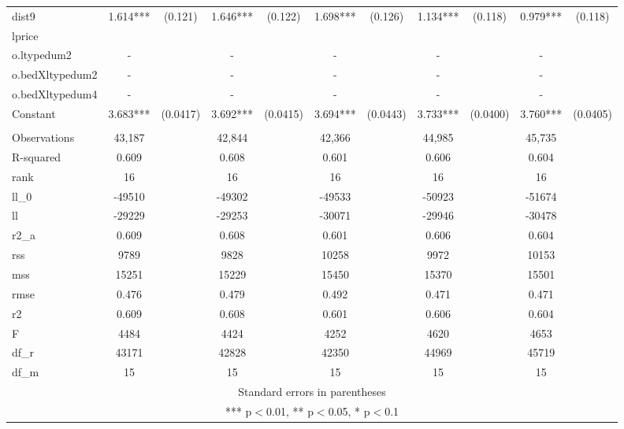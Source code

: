 \documentclass[]{article}
\begin{document}
\begin{tabular}{lcccccccccc}
dist9 & 1.614*** & (0.121) & 1.646*** & (0.122) & 1.698*** & (0.126) & 1.134*** & (0.118) & 0.979*** & (0.118) \\
lprice &  &  &  &  &  &  &  &  &  &  \\
o.ltypedum2 & - &  & - &  & - &  & - &  & - &  \\
o.bedXltypedum2 & - &  & - &  & - &  & - &  & - &  \\
o.bedXltypedum4 & - &  & - &  & - &  & - &  & - &  \\
Constant & 3.683*** & (0.0417) & 3.692*** & (0.0415) & 3.694*** & (0.0443) & 3.733*** & (0.0400) & 3.760*** & (0.0405) \\
 &  &  &  &  &  &  &  &  &  &  \\
Observations & 43,187 &  & 42,844 &  & 42,366 &  & 44,985 &  & 45,735 &  \\
R-squared & 0.609 &  & 0.608 &  & 0.601 &  & 0.606 &  & 0.604 &  \\
rank & 16 &  & 16 &  & 16 &  & 16 &  & 16 &  \\
ll\_0 & -49510 &  & -49302 &  & -49533 &  & -50923 &  & -51674 &  \\
ll & -29229 &  & -29253 &  & -30071 &  & -29946 &  & -30478 &  \\
r2\_a & 0.609 &  & 0.608 &  & 0.601 &  & 0.606 &  & 0.604 &  \\
rss & 9789 &  & 9828 &  & 10258 &  & 9972 &  & 10153 &  \\
mss & 15251 &  & 15229 &  & 15450 &  & 15370 &  & 15501 &  \\
rmse & 0.476 &  & 0.479 &  & 0.492 &  & 0.471 &  & 0.471 &  \\
r2 & 0.609 &  & 0.608 &  & 0.601 &  & 0.606 &  & 0.604 &  \\
F & 4484 &  & 4424 &  & 4252 &  & 4620 &  & 4653 &  \\
df\_r & 43171 &  & 42828 &  & 42350 &  & 44969 &  & 45719 &  \\
 df\_m & 15 &  & 15 &  & 15 &  & 15 &  & 15 &  \\ \hline
\multicolumn{11}{c}{ Standard errors in parentheses} \\
\multicolumn{11}{c}{ *** p$<$0.01, ** p$<$0.05, * p$<$0.1} \\
\end{tabular}
\end{document}
